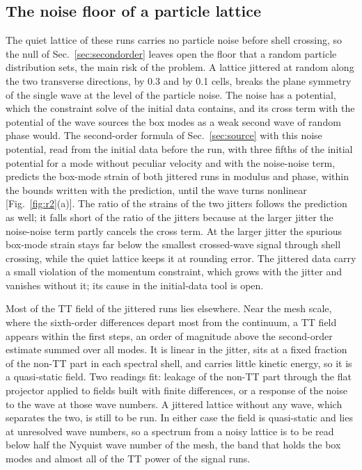 \documentclass[aps,prd,twocolumn,10pt,superscriptaddress,nofootinbib,longbibliography,floatfix]{revtex4-2}
\begin{document}
\subsection{The noise floor of a particle lattice}\label{sec:noise}

The quiet lattice of these runs carries no particle noise before shell crossing, so the null of Sec.~\ref{sec:secondorder} leaves open the floor that a random particle distribution sets, the main risk of the problem. A lattice jittered at random along the two transverse directions, by 0.3 and by 0.1 cells, breaks the plane symmetry of the single wave at the level of the particle noise. The noise has a potential, which the constraint solve of the initial data contains, and its cross term with the potential of the wave sources the box modes as a weak second wave of random phase would. The second-order formula of Sec.~\ref{sec:source} with this noise potential, read from the initial data before the run, with three fifths of the initial potential for a mode without peculiar velocity and with the noise-noise term, predicts the box-mode strain of both jittered runs in modulus and phase, within the bounds written with the prediction, until the wave turns nonlinear [Fig.~\ref{fig:r2}(a)]. The ratio of the strains of the two jitters follows the prediction as well; it falls short of the ratio of the jitters because at the larger jitter the noise-noise term partly cancels the cross term. At the larger jitter the spurious box-mode strain stays far below the smallest crossed-wave signal through shell crossing, while the quiet lattice keeps it at rounding error. The jittered data carry a small violation of the momentum constraint, which grows with the jitter and vanishes without it; its cause in the initial-data tool is open.

Most of the TT field of the jittered runs lies elsewhere. Near the mesh scale, where the sixth-order differences depart most from the continuum, a TT field appears within the first steps, an order of magnitude above the second-order estimate summed over all modes. It is linear in the jitter, sits at a fixed fraction of the non-TT part in each spectral shell, and carries little kinetic energy, so it is a quasi-static field. Two readings fit: leakage of the non-TT part through the flat projector applied to fields built with finite differences, or a response of the noise to the wave at those wave numbers. A jittered lattice without any wave, which separates the two, is still to be run. In either case the field is quasi-static and lies at unresolved wave numbers, so a spectrum from a noisy lattice is to be read below half the Nyquist wave number of the mesh, the band that holds the box modes and almost all of the TT power of the signal runs.
\end{document}
